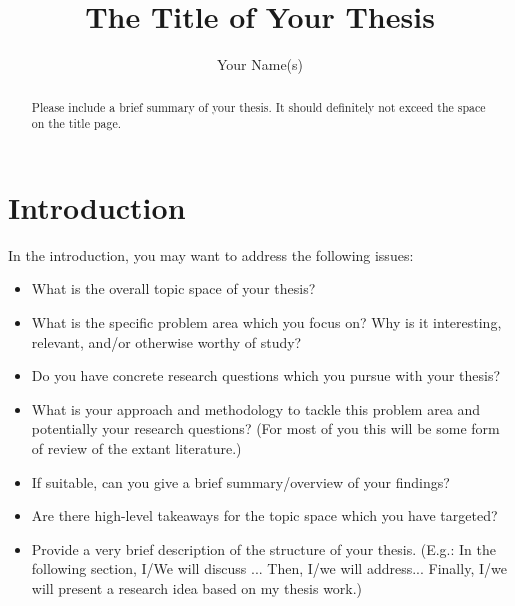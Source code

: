 \documentclass[runningheads,a4paper]{llncs}
\begin{document}
\mainmatter  %

\title{The Title of Your Thesis}


\author{Your Name(s)}

%
%

\maketitle


\begin{abstract}
Please include a brief summary of your thesis. It should definitely not exceed the space on the title page.
\end{abstract}


\section{Introduction}
\label{section:intro}

In the introduction, you may want to address the following issues:
\begin{itemize}
	\item What is the overall topic space of your thesis?
	\item What is the specific problem area which you focus on? Why is it interesting, relevant, and/or otherwise worthy of study?
	\item Do you have concrete research questions which you pursue with your thesis?
	\item What is your approach and methodology to tackle this problem area and potentially your research questions? (For most of you this will be some form of review of the extant literature.)
	\item If suitable, can you give a brief summary/overview of your findings?
	\item Are there high-level takeaways for the topic space which you have targeted?
	\item Provide a very brief description of the structure of your thesis. (E.g.: In the following section, I/We will discuss ... Then, I/we will address... Finally, I/we will present a research idea based on my thesis work.)
	
\end{itemize}
\end{document}
